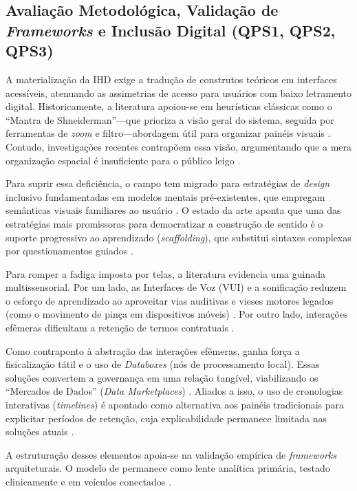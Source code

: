\documentclass[12pt]{article}
\begin{document}
    \subsection{Avaliação Metodológica, Validação de \textit{Frameworks} e Inclusão Digital (QPS1, QPS2, QPS3)}

    A materialização da IHD exige a tradução de construtos teóricos em interfaces acessíveis, atenuando as assimetrias de acesso para usuários com baixo letramento digital. Historicamente, a literatura apoiou-se em heurísticas clássicas como o ``Mantra de Shneiderman''---que prioriza a visão geral do sistema, seguida por ferramentas de \textit{zoom} e filtro---abordagem útil para organizar painéis visuais \cite{Victorelli2020Human}. Contudo, investigações recentes contrapõem essa visão, argumentando que a mera organização espacial é insuficiente para o público leigo \cite{Yuan20243615, Lindley2020}.

    Para suprir essa deficiência, o campo tem migrado para estratégias de \textit{design} inclusivo fundamentadas em modelos mentais pré-existentes, que empregam semânticas visuais familiares ao usuário \cite{Barreto2018, DeAlmeida2019}. O estado da arte aponta que uma das estratégias mais promissoras para democratizar a construção de sentido é o suporte progressivo ao aprendizado (\textit{scaffolding}), que substitui sintaxes complexas por questionamentos guiados \cite{Trajkova2020}.

    Para romper a fadiga imposta por telas, a literatura evidencia uma guinada multissensorial. Por um lado, as Interfaces de Voz (VUI) e a sonificação reduzem o esforço de aprendizado ao aproveitar vias auditivas e vieses motores legados (como o movimento de pinça em dispositivos móveis) \cite{Sailaja2021, Friedman2024}. Por outro lado, interações efêmeras dificultam a retenção de termos contratuais \cite{Jones2017, Lockwood2021}. 

    Como contraponto à abstração das interações efêmeras, ganha força a fisicalização tátil e o uso de \textit{Databoxes} (nós de processamento local). Essas soluções convertem a governança em uma relação tangível, viabilizando os ``Mercados de Dados'' (\textit{Data Marketplaces}) \cite{Crabtree2016}. Aliados a isso, o uso de cronologias interativas (\textit{timelines}) é apontado como alternativa aos painéis tradicionais para explicitar períodos de retenção, cuja explicabilidade permanece limitada nas soluções atuais \cite{DeAlmeida2019}.

    A estruturação desses elementos apoia-se na validação empírica de \textit{frameworks} arquiteturais. O modelo de \cite{mortier2015humandatainteractionhumanface} permanece como lente analítica primária, testado clinicamente \cite{sailaja2021exploring} e em veículos conectados \cite{DOWTHWAITE2024}. 
\end{document}
